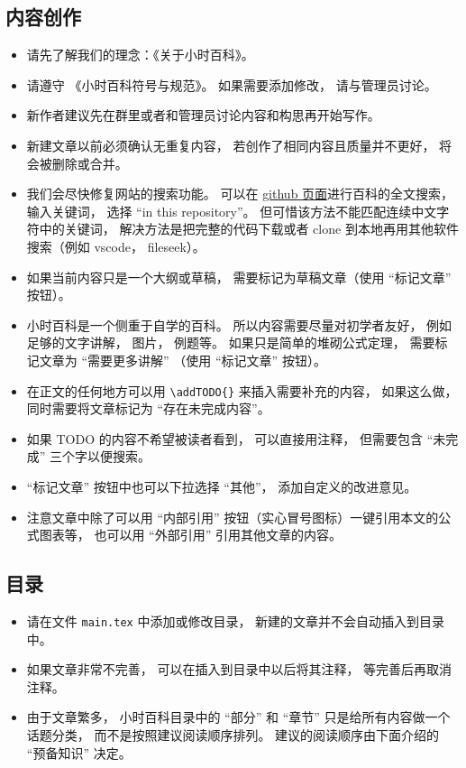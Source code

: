
\subsection{内容创作}
\begin{itemize}
\item 请先了解我们的理念：《关于小时百科》。
\item 请遵守 《小时百科符号与规范》。 如果需要添加修改， 请与管理员讨论。
\item 新作者建议先在群里或者和管理员讨论内容和构思再开始写作。
\item 新建文章以前必须确认无重复内容， 若创作了相同内容且质量并不更好， 将会被删除或合并。
\item 我们会尽快修复网站的搜索功能。 可以在 \href{https://github.com/MacroUniverse/PhysWiki-log}{github 页面}进行百科的全文搜索， 输入关键词， 选择 “in this repository”。 但可惜该方法不能匹配连续中文字符中的关键词， 解决方法是把完整的代码下载或者 clone 到本地再用其他软件搜索（例如 vscode， fileseek）。
\item 如果当前内容只是一个大纲或草稿， 需要标记为草稿文章（使用 “标记文章” 按钮）。
\item 小时百科是一个侧重于自学的百科。 所以内容需要尽量对初学者友好， 例如足够的文字讲解， 图片， 例题等。 如果只是简单的堆砌公式定理， 需要标记文章为 “需要更多讲解” （使用 “标记文章” 按钮）。
\item 在正文的任何地方可以用 \verb|\addTODO{}| 来插入需要补充的内容， 如果这么做， 同时需要将文章标记为 “存在未完成内容”。
\item 如果 TODO 的内容不希望被读者看到， 可以直接用注释， 但需要包含 “未完成” 三个字以便搜索。
\item “标记文章” 按钮中也可以下拉选择 “其他”， 添加自定义的改进意见。
\item 注意文章中除了可以用 “内部引用” 按钮（实心冒号图标）一键引用本文的公式图表等， 也可以用 “外部引用” 引用其他文章的内容。
\end{itemize}

\subsection{目录}
\begin{itemize}
\item 请在文件 \verb|main.tex| 中添加或修改目录， 新建的文章并不会自动插入到目录中。
\item 如果文章非常不完善， 可以在插入到目录中以后将其注释， 等完善后再取消注释。
\item 由于文章繁多， 小时百科目录中的 “部分” 和 “章节” 只是给所有内容做一个话题分类， 而不是按照建议阅读顺序排列。 建议的阅读顺序由下面介绍的 “预备知识” 决定。
\end{itemize}

